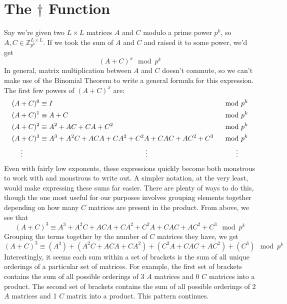 \documentclass[a4paper, 12pt, reqno]{amsart}
\begin{document}
	\section{The $\dag$ Function}
		\label{sec:dagger}
		Say we're given two $L \times L$ matrices $A$ and $C$ modulo a prime power $p^k$, so $A, C \in \mathds{Z}_{p^k}^{L \times L}$. If we took the sum of $A$ and $C$ and
		raised it to some power, we'd get
		\[
			(A + C)^x \mod{p^k}
		\]
		In general, matrix multiplication between $A$ and $C$ doesn't commute, so we can't make use of the Binomial Theorem to write a general formula for this expression. 
		The first few powers of $(A + C)^x$ are:
		\begin{alignat*}{2}
			(A + C)^0              & \equiv I                                                     & \mod{p^k} \\
			(A + C)^1              & \equiv A + C                                                 & \mod{p^k} \\
			(A + C)^2              & \equiv A^2 + AC + CA + C^2                                   & \mod{p^k} \\
			(A + C)^3              & \equiv A^3 + {A^2}C + ACA + CA^2 + {C^2}A + CAC + AC^2 + C^3 & \mod{p^k} \\
			\vdots \hspace{0.85cm} & \hspace{5.33cm} \vdots                                       & \vdots \hspace{0.5cm}
		\end{alignat*}
		Even with fairly low exponents, these expressions quickly become both monstrous to work with and monstrous to write out. A simpler notation, at the very least, would
		make expressing these sums far easier. There are plenty of ways to do this, though the one most useful for our purposes involves grouping elements together 
		depending on how many $C$ matrices are present in the product. From above, we see that
		\[
			(A + C)^3 \equiv A^3 + {A^2}C + ACA + CA^2 + {C^2}A + CAC + AC^2 + C^3 \mod{p^k}
		\]
		Grouping the terms together by the number of $C$ matrices they have, we get
		\[
			(A + C)^3 \equiv (A^3) + ({A^2}C + ACA + CA^2) + ({C^2}A + CAC + AC^2) + (C^3) \mod{p^k}
		\]
		Interestingly, it seems each sum within a set of brackets is the sum of all unique orderings of a particular set of matrices. For example, the first set of
		brackets contains the sum of all possible orderings of 3 $A$ matrices and 0 $C$ matrices into a product. The second set of brackets contains the sum of all possible
		orderings of 2 $A$ matrices and 1 $C$ matrix into a product. This pattern continues.
		
\end{document}
